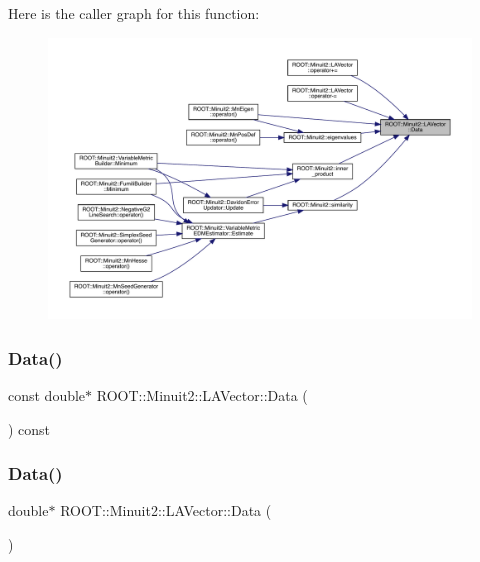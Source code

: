 Here is the caller graph for this function\+:\nopagebreak
\begin{figure}[H]
\begin{center}
\leavevmode
\includegraphics[width=350pt]{d3/d20/classROOT_1_1Minuit2_1_1LAVector_a22e21b176e4d63740045edb4c12fe0a3_icgraph}
\end{center}
\end{figure}
\mbox{\label{classROOT_1_1Minuit2_1_1LAVector_a22e21b176e4d63740045edb4c12fe0a3}} 
\subsubsection{\texorpdfstring{Data()}{Data()}\hspace{0.1cm}{\footnotesize\ttfamily [2/4]}}
{\footnotesize\ttfamily const double$\ast$ R\+O\+O\+T\+::\+Minuit2\+::\+L\+A\+Vector\+::\+Data (\begin{DoxyParamCaption}{ }\end{DoxyParamCaption}) const\hspace{0.3cm}{\ttfamily [inline]}}

\mbox{\label{classROOT_1_1Minuit2_1_1LAVector_ad2685b4f4d71a3a68fcf447779dec718}} 
\subsubsection{\texorpdfstring{Data()}{Data()}\hspace{0.1cm}{\footnotesize\ttfamily [3/4]}}
{\footnotesize\ttfamily double$\ast$ R\+O\+O\+T\+::\+Minuit2\+::\+L\+A\+Vector\+::\+Data (\begin{DoxyParamCaption}{ }\end{DoxyParamCaption})\hspace{0.3cm}{\ttfamily [inline]}}

